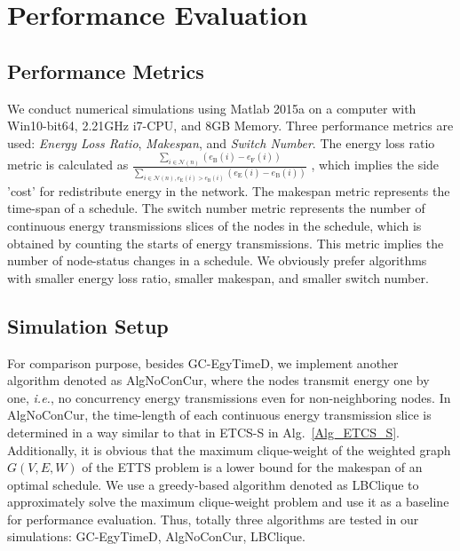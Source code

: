 \documentclass[journal,10pt]{IEEEtran}
\begin{document}
\section{Performance Evaluation}
\label{sec_sim}
\subsection{Performance Metrics}
We conduct numerical simulations using Matlab 2015a on a computer with Win10-bit64, 2.21GHz i7-CPU, and 8GB Memory. Three performance metrics are used: \textit{Energy Loss Ratio}, \textit{Makespan}, and \textit{Switch Number}. The energy loss ratio metric is calculated as  $\frac{\sum_{i{\in}\mathcal{N}(n)}(e_\text{B}(i){-}e_\text{F}(i))}{\sum_{i{\in}\mathcal{N}(n),e_\text{E}(i){>}e_\text{B}(i)}(e_\text{E}(i){-}e_\text{B}(i))}$   , which implies the side 'cost' for redistribute energy in the network. The makespan metric represents the time-span of a schedule. The switch number metric represents the number of continuous energy transmissions slices of the nodes in the schedule, which is obtained by counting the starts of energy transmissions. This metric implies the number of node-status changes in a schedule. We obviously prefer algorithms with smaller energy loss ratio, smaller makespan, and smaller switch number.

\subsection{Simulation Setup}
For comparison purpose, besides GC-EgyTimeD, we implement another algorithm denoted as AlgNoConCur, where the nodes transmit energy one by one, \textit{i.e.}, no concurrency energy transmissions even for non-neighboring nodes. In AlgNoConCur, the time-length of each continuous energy transmission slice is determined in a way similar to that in ETCS-S in Alg.~\ref{Alg_ETCS_S}. Additionally, it is obvious that the maximum clique-weight of the weighted graph $G(V,E,W)$ of the ETTS problem is a lower bound for the makespan of an optimal schedule. We use a greedy-based algorithm denoted as LBClique to approximately solve the maximum clique-weight problem and use it as a baseline for performance evaluation. Thus, totally three algorithms are tested in our simulations: GC-EgyTimeD, AlgNoConCur, LBClique.
\end{document}
